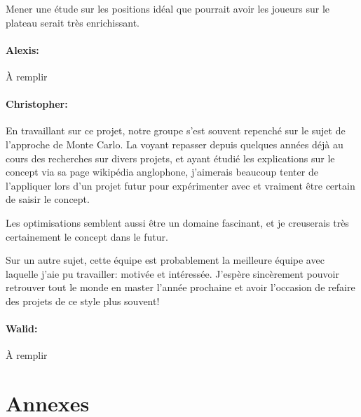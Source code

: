 \documentclass[
	headsepline=on,
	footsepline=on,
	twoside=off,
	abstract=on,
	DIV=10
]{scrreprt}
\begin{document}
				Mener une étude sur les positions idéal que pourrait avoir les joueurs sur le plateau serait très enrichissant.

				\subsection{Alexis:} À remplir

				\subsection{Christopher:} 
				En travaillant sur ce projet, notre groupe s'est souvent repenché sur le sujet de l'approche de Monte Carlo. 
				La voyant repasser depuis quelques années déjà au cours des recherches sur divers projets, et ayant étudié les explications sur le concept via sa page wikipédia anglophone, j'aimerais beaucoup tenter de l'appliquer lors d'un projet futur pour expérimenter avec et vraiment être certain de saisir le concept.
				
				Les optimisations semblent aussi être un domaine fascinant, et je creuserais très certainement le concept dans le futur.
				
				Sur un autre sujet, cette équipe est probablement la meilleure équipe avec laquelle j'aie pu travailler: motivée et intéressée. 
				J'espère sincèrement pouvoir retrouver tout le monde en master l'année prochaine et avoir l'occasion de refaire des projets de ce style plus souvent!
				

				\subsection{Walid:} À remplir

			\cleardoublepage
			\pagebreak
			
		\part{Annexes}
		
			
	
	
\end{document}
